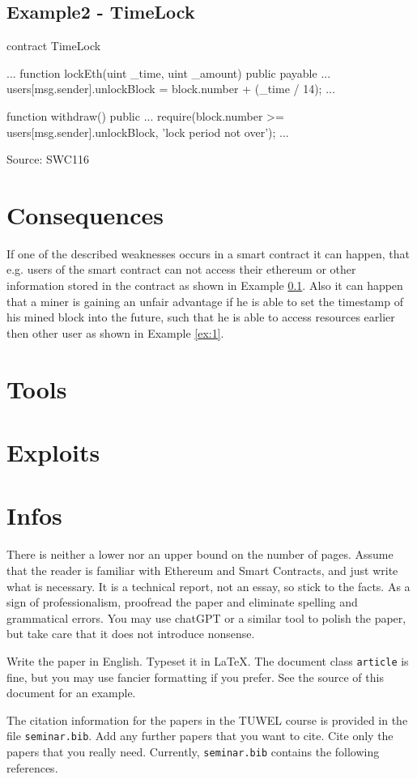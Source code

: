 \documentclass{article}
\begin{document}
\subsection{Example2 - TimeLock} \label{ex:2}
\begin{solidity} 
    contract TimeLock {
		...
		function lockEth(uint _time, uint _amount) public payable {
			...
			users[msg.sender].unlockBlock = block.number + (_time / 14);
			...
		}

    function withdraw() public {
		...
        require(block.number >= users[msg.sender].unlockBlock, 'lock period not over');
		...
    }
}
\end{solidity}
Source: SWC116 \cite{swc116}

\section{Consequences}
If one of the described weaknesses occurs in a smart contract it can happen, that e.g. users of the smart contract can not access
their ethereum or other information stored in the contract as shown in Example \ref{ex:2}. \newline
Also it can happen that a miner is gaining an unfair advantage if he is able to set the timestamp of his mined block into the future,
such that he is able to access resources earlier then other user as shown in Example \ref{ex:1}.

\section{Tools}
\section{Exploits}

\section{Infos}
There is neither a lower nor an upper bound on the number of pages. Assume that
the reader is familiar with Ethereum and Smart Contracts, and just write what
is necessary. It is a technical report, not an essay, so stick to the facts. As
a sign of professionalism, proofread the paper and eliminate spelling and
grammatical errors. You may use chatGPT or a similar tool to polish the paper,
but take care that it does not introduce nonsense.

Write the paper in English. Typeset it in \LaTeX. The document class
\verb"article" is fine, but you may use fancier formatting if you prefer. See
the source of this document for an example.

The citation information for the papers in the TUWEL course is provided
in the file \verb"seminar.bib". Add any further papers that you want to cite.
Cite only the papers that you really need.
Currently, \verb"seminar.bib" contains the following references.
\nocite{*}


\end{document}
